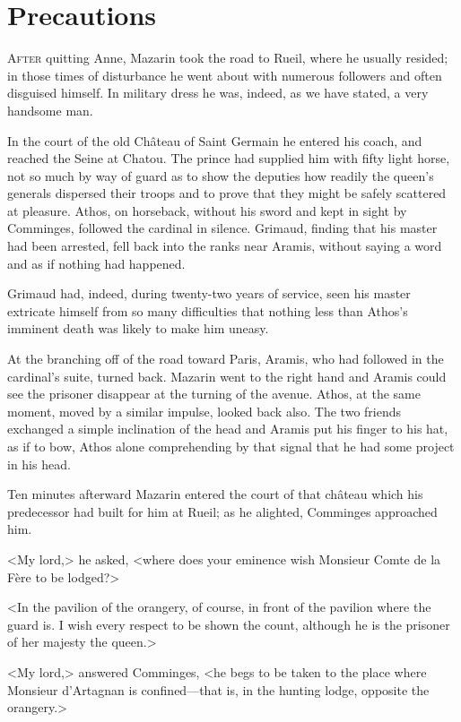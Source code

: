 \chapter{Precautions}

 \lettrine{A}{fter} quitting Anne, Mazarin took the road to Rueil, where he usually resided; in those times of disturbance he went about with numerous followers and often disguised himself. In military dress he was, indeed, as we have stated, a very handsome man.

In the court of the old Château of Saint Germain he entered his coach, and reached the Seine at Chatou. The prince had supplied him with fifty light horse, not so much by way of guard as to show the deputies how readily the queen's generals dispersed their troops and to prove that they might be safely scattered at pleasure. Athos, on horseback, without his sword and kept in sight by Comminges, followed the cardinal in silence. Grimaud, finding that his master had been arrested, fell back into the ranks near Aramis, without saying a word and as if nothing had happened.

Grimaud had, indeed, during twenty-two years of service, seen his master extricate himself from so many difficulties that nothing less than Athos's imminent death was likely to make him uneasy.

At the branching off of the road toward Paris, Aramis, who had followed in the cardinal's suite, turned back. Mazarin went to the right hand and Aramis could see the prisoner disappear at the turning of the avenue. Athos, at the same moment, moved by a similar impulse, looked back also. The two friends exchanged a simple inclination of the head and Aramis put his finger to his hat, as if to bow, Athos alone comprehending by that signal that he had some project in his head.

Ten minutes afterward Mazarin entered the court of that château which his predecessor had built for him at Rueil; as he alighted, Comminges approached him.

<My lord,> he asked, <where does your eminence wish Monsieur Comte de la Fère to be lodged?>

<In the pavilion of the orangery, of course, in front of the pavilion where the guard is. I wish every respect to be shown the count, although he is the prisoner of her majesty the queen.>

<My lord,> answered Comminges, <he begs to be taken to the place where Monsieur d'Artagnan is confined—that is, in the hunting lodge, opposite the orangery.>

